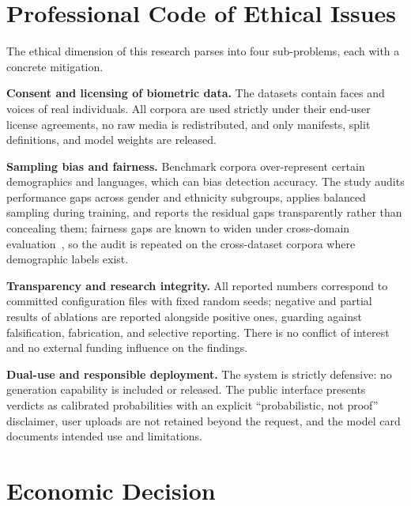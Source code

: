 \section{Professional Code of Ethical Issues}
\label{sec:ethics}

The ethical dimension of this research parses into four sub-problems, each with
a concrete mitigation.

\textbf{Consent and licensing of biometric data.} The datasets contain faces
and voices of real individuals. All corpora are used strictly under their
end-user license agreements, no raw media is redistributed, and only manifests,
split definitions, and model weights are released.

\textbf{Sampling bias and fairness.} Benchmark corpora over-represent certain
demographics and languages, which can bias detection accuracy. The study
audits performance gaps across gender and ethnicity subgroups, applies
balanced sampling during training, and reports the residual gaps
transparently rather than concealing them; fairness gaps are known to widen
under cross-domain evaluation~\cite{lin2024fairnessgen}, so the audit is
repeated on the cross-dataset corpora where demographic labels exist.

\textbf{Transparency and research integrity.} All reported numbers correspond
to committed configuration files with fixed random seeds; negative and partial
results of ablations are reported alongside positive ones, guarding against
falsification, fabrication, and selective reporting. There is no conflict of
interest and no external funding influence on the findings.

\textbf{Dual-use and responsible deployment.} The system is strictly
defensive: no generation capability is included or released. The public
interface presents verdicts as calibrated probabilities with an explicit
``probabilistic, not proof'' disclaimer, user uploads are not retained beyond
the request, and the model card documents intended use and limitations.

\section{Economic Decision}
\label{sec:economic}


